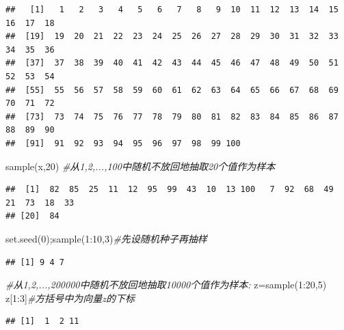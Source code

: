 \documentclass[
]{book}
\newenvironment{Shaded}{\begin{snugshade}}{\end{snugshade}}
\newcommand{\CommentTok}[1]{\textcolor[rgb]{0.56,0.35,0.01}{\textit{#1}}}
\newcommand{\DecValTok}[1]{\textcolor[rgb]{0.00,0.00,0.81}{#1}}
\newcommand{\FunctionTok}[1]{\textcolor[rgb]{0.00,0.00,0.00}{#1}}
\newcommand{\NormalTok}[1]{#1}
\newcommand{\OtherTok}[1]{\textcolor[rgb]{0.56,0.35,0.01}{#1}}
\newcommand{\SpecialCharTok}[1]{\textcolor[rgb]{0.00,0.00,0.00}{#1}}
\begin{document}
\begin{verbatim}
##   [1]   1   2   3   4   5   6   7   8   9  10  11  12  13  14  15  16  17  18
##  [19]  19  20  21  22  23  24  25  26  27  28  29  30  31  32  33  34  35  36
##  [37]  37  38  39  40  41  42  43  44  45  46  47  48  49  50  51  52  53  54
##  [55]  55  56  57  58  59  60  61  62  63  64  65  66  67  68  69  70  71  72
##  [73]  73  74  75  76  77  78  79  80  81  82  83  84  85  86  87  88  89  90
##  [91]  91  92  93  94  95  96  97  98  99 100
\end{verbatim}

\begin{Shaded}
\begin{Highlighting}[]
\FunctionTok{sample}\NormalTok{(x,}\DecValTok{20}\NormalTok{) }\CommentTok{\#从1,2,...,100中随机不放回地抽取20个值作为样本}
\end{Highlighting}
\end{Shaded}

\begin{verbatim}
##  [1]  82  85  25  11  12  95  99  43  10  13 100   7  92  68  49  21  73  18  33
## [20]  84
\end{verbatim}

\begin{Shaded}
\begin{Highlighting}[]
\FunctionTok{set.seed}\NormalTok{(}\DecValTok{0}\NormalTok{);}\FunctionTok{sample}\NormalTok{(}\DecValTok{1}\SpecialCharTok{:}\DecValTok{10}\NormalTok{,}\DecValTok{3}\NormalTok{)}\CommentTok{\#先设随机种子再抽样}
\end{Highlighting}
\end{Shaded}

\begin{verbatim}
## [1] 9 4 7
\end{verbatim}

\begin{Shaded}
\begin{Highlighting}[]
\CommentTok{\#从1,2,...,200000中随机不放回地抽取10000个值作为样本:}
\NormalTok{z}\OtherTok{=}\FunctionTok{sample}\NormalTok{(}\DecValTok{1}\SpecialCharTok{:}\DecValTok{20}\NormalTok{,}\DecValTok{5}\NormalTok{)}
\NormalTok{z[}\DecValTok{1}\SpecialCharTok{:}\DecValTok{3}\NormalTok{]}\CommentTok{\#方括号中为向量z的下标}
\end{Highlighting}
\end{Shaded}

\begin{verbatim}
## [1]  1  2 11
\end{verbatim}
\end{document}
